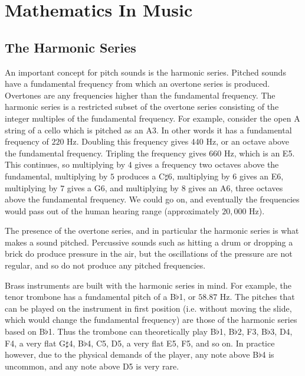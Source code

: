 \chapter{Mathematics In Music} \label{mathinmusic}

\section{The Harmonic Series} \label{mathinmusic:harmonic}

An important concept for pitch sounds is the harmonic series.
Pitched sounds have a fundamental frequency from which an overtone series is produced.
Overtones are any frequencies higher than the fundamental frequency.
The harmonic series is a restricted subset of the overtone series consisting of the integer multiples of the fundamental frequency.
For example, consider the open A string of a cello which is pitched as an A3.
In other words it has a fundamental frequency of $220$ Hz.
Doubling this frequency gives $440$ Hz, or an octave above the fundamental frequency.
Tripling the frequency gives $660$ Hz, which is an E5.
This continues, so multiplying by $4$ gives a frequency two octaves above the fundamental, multiplying by $5$ produces a C$\sharp$6, multiplying by $6$ gives an E6, multiplying by $7$ gives a G6, and multiplying by $8$ gives an A6, three octaves above the fundamental frequency.
We could go on, and eventually the frequencies would pass out of the human hearing range (approximately $20,000$ Hz).

The presence of the overtone series, and in particular the harmonic series is what makes a sound pitched.
Percussive sounds such as hitting a drum or dropping a brick do produce pressure in the air, but the oscillations of the pressure are not regular, and so do not produce any pitched frequencies.

Brass instruments are built with the harmonic series in mind.
For example, the tenor trombone has a fundamental pitch of a B$\flat$1, or $58.87$ Hz.
The pitches that can be played on the instrument in first position (i.e. without moving the slide, which would change the fundamental frequency) are those of the harmonic series based on B$\flat$1.
Thus the trombone can theoretically play B$\flat$1, B$\flat$2, F3, B$\flat$3, D4, F4, a very flat G$\sharp$4, B$\flat$4, C5, D5, a very flat E5, F5, and so on.
In practice however, due to the physical demands of the player, any note above B$\flat$4 is uncommon, and any note above D5 is very rare.


